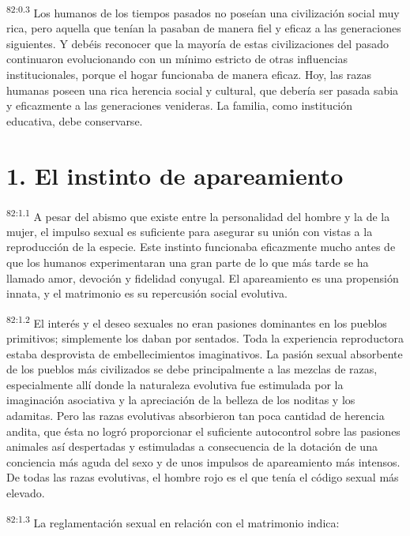 \documentclass[twoside, 11pt]{book}
\begin{document}
\par
\textsuperscript{82:0.3} Los humanos de los tiempos pasados no poseían una civilización social muy rica, pero aquella que tenían la pasaban de manera fiel y eficaz a las generaciones siguientes. Y debéis reconocer que la mayoría de estas civilizaciones del pasado continuaron evolucionando con un mínimo estricto de otras influencias institucionales, porque el hogar funcionaba de manera eficaz. Hoy, las razas humanas poseen una rica herencia social y cultural, que debería ser pasada sabia y eficazmente a las generaciones venideras. La familia, como institución educativa, debe conservarse.

\section*{1. El instinto de apareamiento}
\par
\textsuperscript{82:1.1} A pesar del abismo que existe entre la personalidad del hombre y la de la mujer, el impulso sexual es suficiente para asegurar su unión con vistas a la reproducción de la especie. Este instinto funcionaba eficazmente mucho antes de que los humanos experimentaran una gran parte de lo que más tarde se ha llamado amor, devoción y fidelidad conyugal. El apareamiento es una propensión innata, y el matrimonio es su repercusión social evolutiva.

\par
\textsuperscript{82:1.2} El interés y el deseo sexuales no eran pasiones dominantes en los pueblos primitivos; simplemente los daban por sentados. Toda la experiencia reproductora estaba desprovista de embellecimientos imaginativos. La pasión sexual absorbente de los pueblos más civilizados se debe principalmente a las mezclas de razas, especialmente allí donde la naturaleza evolutiva fue estimulada por la imaginación asociativa y la apreciación de la belleza de los noditas y los adamitas. Pero las razas evolutivas absorbieron tan poca cantidad de herencia andita, que ésta no logró proporcionar el suficiente autocontrol sobre las pasiones animales así despertadas y estimuladas a consecuencia de la dotación de una conciencia más aguda del sexo y de unos impulsos de apareamiento más intensos. De todas las razas evolutivas, el hombre rojo es el que tenía el código sexual más elevado.

\par
\textsuperscript{82:1.3} La reglamentación sexual en relación con el matrimonio indica:
\end{document}
